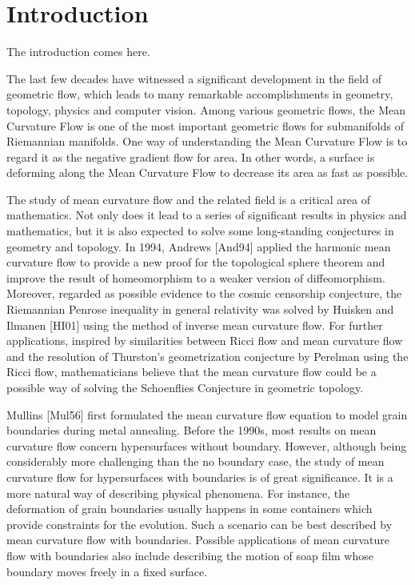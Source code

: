 %

\chapter{Introduction}

{
The introduction comes here.
}

The last few decades have witnessed a significant development in the field of geometric flow, which leads to many remarkable accomplishments in geometry, topology, physics and computer vision. Among various geometric flows, the Mean Curvature Flow is one of the most important geometric flows for submanifolds of Riemannian manifolds. One way of understanding the Mean Curvature Flow is to regard it as the negative gradient flow for area. In other words, a surface is deforming along the Mean Curvature Flow to decrease its area as fast as possible.

The study of mean curvature flow and the related field is a critical area of mathematics. Not only does it lead to a series of significant results in physics and mathematics, but it is also expected to solve some long-standing conjectures in geometry and topology. In 1994, Andrews [And94] applied the harmonic mean curvature flow to provide a new proof for the topological sphere theorem and improve the result of homeomorphism to a weaker version of diffeomorphism. Moreover, regarded as possible evidence to the cosmic censorship conjecture, the Riemannian Penrose inequality in general relativity was solved by Huisken and Ilmanen [HI01] using the method of inverse mean curvature flow. For further applications, inspired by similarities between Ricci flow and mean curvature flow and the resolution of Thurston's geometrization conjecture by Perelman using the Ricci flow, mathematicians believe that the mean curvature flow could be a possible way of solving the Schoenflies Conjecture in geometric topology.

Mullins [Mul56] first formulated the mean curvature flow equation to model grain boundaries during metal annealing. Before the 1990s, most results on mean curvature flow concern hypersurfaces without boundary. However, although being considerably more challenging than the no boundary case, the study of mean curvature flow for hypersurfaces with boundaries is of great significance. It is a more natural way of describing physical phenomena. For instance, the deformation of grain boundaries usually happens in some containers which provide constraints for the evolution. Such a scenario can be best described by mean curvature flow with boundaries. Possible applications of mean curvature flow with boundaries also include describing the motion of soap film whose boundary moves freely in a fixed surface.

